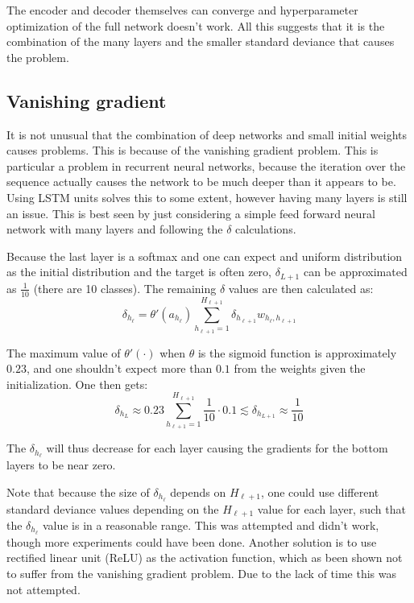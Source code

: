 The encoder and decoder themselves can converge and hyperparameter optimization of the full network doesn't work. All this suggests that it is the combination of the many layers and the smaller standard deviance that causes the problem.

\subsection{Vanishing gradient}
It is not unusual that the combination of deep networks and small initial weights causes problems. This is because of the vanishing gradient problem. This is particular a problem in recurrent neural networks, because the iteration over the sequence actually causes the network to be much deeper than it appears to be. Using LSTM units solves this to some extent, however having many layers is still an issue. This is best seen by just considering a simple feed forward neural network with many layers and following the $\delta$ calculations.

Because the last layer is a softmax and one can expect and uniform distribution as the initial distribution and the target is often zero, $\delta_{L+1}$ can be approximated as $\frac{1}{10}$ (there are 10 classes). The remaining $\delta$ values are then calculated as:
\begin{equation}
\delta_{h_\ell} = \theta'(a_{h_\ell}) \sum_{h_{\ell+1} = 1}^{H_{\ell+1}} \delta_{h_{\ell+1}} w_{h_\ell, h_{\ell+1}}
\end{equation}

The maximum value of $\theta'(\cdot)$ when $\theta$ is the sigmoid function is approximately $0.23$, and one shouldn't expect more than $0.1$ from the weights given the initialization. One then gets:
\begin{equation}
\delta_{h_L} \approx 0.23 \sum_{h_{\ell+1} = 1}^{H_{\ell+1}} \frac{1}{10} \cdot 0.1 \lesssim \delta_{h_{L+1}} \approx \frac{1}{10}
\end{equation}

The $\delta_{h_\ell}$ will thus decrease for each layer causing the gradients for the bottom layers to be near zero.

Note that because the size of $\delta_{h_\ell}$ depends on $H_{\ell+1}$, one could use different standard deviance values depending on the $H_{\ell+1}$ value for each layer, such that the $\delta_{h_\ell}$ value is in a reasonable range. This was attempted and didn't work, though more experiments could have been done. Another solution is to use rectified linear unit (ReLU) as the activation function, which as been shown not to suffer from the vanishing gradient problem. Due to the lack of time this was not attempted.

